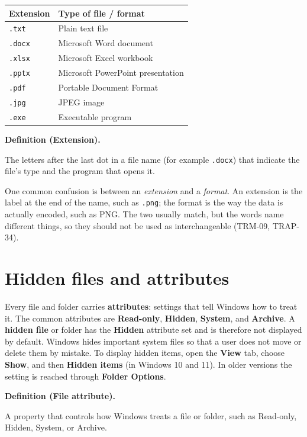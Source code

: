 \documentclass[11pt]{article}
\newenvironment{definitionbox}[1]{%
  \par\noindent\textbf{Definition (#1).}\ \itshape
}{\par\vspace{0.3em}}
\begin{document}
\begin{center}
\begin{tabular}{p{}p{}}
\toprule
\textbf{Extension} & \textbf{Type of file / format} \\
\midrule
\texttt{.txt} & Plain text file \\
\texttt{.docx} & Microsoft Word document \\
\texttt{.xlsx} & Microsoft Excel workbook \\
\texttt{.pptx} & Microsoft PowerPoint presentation \\
\texttt{.pdf} & Portable Document Format \\
\texttt{.jpg} & JPEG image \\
\texttt{.exe} & Executable program \\
\bottomrule
\end{tabular}
\end{center}

\begin{definitionbox}{Extension}
The letters after the last dot in a file name (for example \texttt{.docx})
that indicate the file's type and the program that opens it.
\end{definitionbox}

One common confusion is between an \emph{extension} and a \emph{format}. An
extension is the label at the end of the name, such as \texttt{.png}; the
format is the way the data is actually encoded, such as PNG. The two usually
match, but the words name different things, so they should not be used as
interchangeable (TRM-09, TRAP-34).

\section{Hidden files and attributes}
Every file and folder carries \textbf{attributes}: settings that tell Windows
how to treat it. The common attributes are \textbf{Read-only}, \textbf{Hidden},
\textbf{System}, and \textbf{Archive}. A \textbf{hidden file} or folder has
the \textbf{Hidden} attribute set and is therefore not displayed by default.
Windows hides important system files so that a user does not move or delete
them by mistake. To display hidden items, open the \textbf{View} tab, choose
\textbf{Show}, and then \textbf{Hidden items} (in Windows 10 and 11). In older
versions the setting is reached through \textbf{Folder Options}.

\begin{definitionbox}{File attribute}
A property that controls how Windows treats a file or folder, such as
Read-only, Hidden, System, or Archive.
\end{definitionbox}
\end{document}
